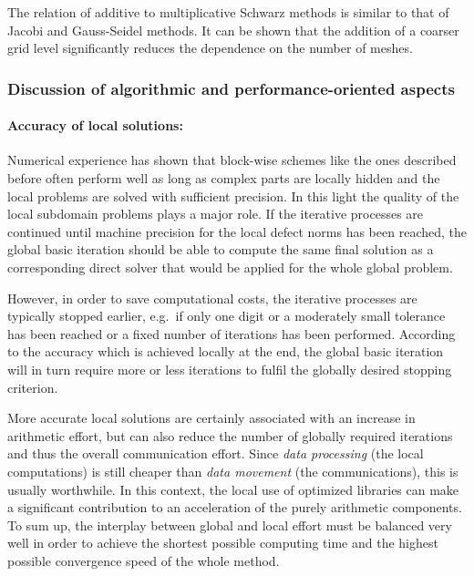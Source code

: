 The relation of additive to multiplicative Schwarz methods is similar to that of Jacobi and Gauss-Seidel methods.
It can be shown that the addition of a coarser grid level significantly reduces the dependence on the number of meshes.

\subsubsection{Discussion of algorithmic and performance-oriented aspects}
\label{SEC_SCARC_discussion}

\paragraph{Accuracy of local solutions:}
Numerical experience has shown that block-wise schemes like the ones described before often perform well as long as complex parts 
are locally hidden and the local problems are solved with sufficient precision. In this light the quality of the local subdomain problems plays a major role. 
If the iterative processes are continued until machine precision for the local defect norms has been reached, the global basic iteration should be able to compute the same final solution as a corresponding direct solver that would be applied for the whole global problem.

However, in order to save computational costs, the iterative processes are typically stopped earlier, e.g.\ if only one digit or a moderately small tolerance has been reached or a fixed number of iterations has been performed.
According to the accuracy which is achieved locally at the end, the global basic iteration will in turn require more or less iterations to fulfil the globally desired stopping criterion. 

More accurate local solutions are certainly associated with an increase in arithmetic effort, but can also reduce the number of globally required iterations and thus the overall communication effort. Since {\it data processing} (the local computations) is still cheaper than {\it data movement} (the communications), this is usually worthwhile.
In this context, the local use of optimized libraries can make a significant contribution to an acceleration of the purely arithmetic components.
To sum up, the interplay between global and local effort must be balanced very well in order to achieve the shortest possible computing time and the highest possible convergence speed of the whole method.

